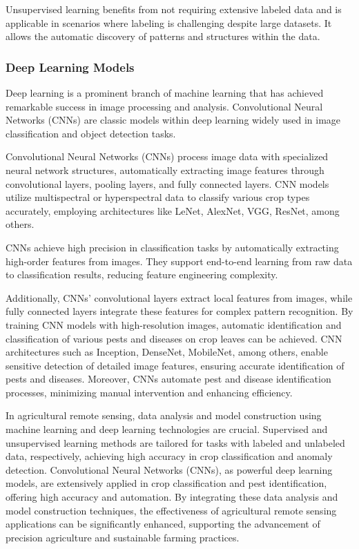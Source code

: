 Unsupervised learning benefits from not requiring extensive labeled data and is applicable in scenarios where labeling is challenging despite large datasets. It allows the automatic discovery of patterns and structures within the data.

\subsubsection{Deep Learning Models}

Deep learning is a prominent branch of machine learning that has achieved remarkable success in image processing and analysis. Convolutional Neural Networks (CNNs) are classic models within deep learning widely used in image classification and object detection tasks.

Convolutional Neural Networks (CNNs) process image data with specialized neural network structures, automatically extracting image features through convolutional layers, pooling layers, and fully connected layers. CNN models utilize multispectral or hyperspectral data to classify various crop types accurately, employing architectures like LeNet, AlexNet, VGG, ResNet, among others.

CNNs achieve high precision in classification tasks by automatically extracting high-order features from images. They support end-to-end learning from raw data to classification results, reducing feature engineering complexity.

Additionally, CNNs' convolutional layers extract local features from images, while fully connected layers integrate these features for complex pattern recognition. By training CNN models with high-resolution images, automatic identification and classification of various pests and diseases on crop leaves can be achieved. CNN architectures such as Inception, DenseNet, MobileNet, among others, enable sensitive detection of detailed image features, ensuring accurate identification of pests and diseases\cite{navalgundRemoteSensingApplications2007}. Moreover, CNNs automate pest and disease identification processes, minimizing manual intervention and enhancing efficiency.

In agricultural remote sensing, data analysis and model construction using machine learning and deep learning technologies are crucial. Supervised and unsupervised learning methods are tailored for tasks with labeled and unlabeled data, respectively, achieving high accuracy in crop classification and anomaly detection. Convolutional Neural Networks (CNNs), as powerful deep learning models, are extensively applied in crop classification and pest identification, offering high accuracy and automation. By integrating these data analysis and model construction techniques, the effectiveness of agricultural remote sensing applications can be significantly enhanced, supporting the advancement of precision agriculture and sustainable farming practices.
